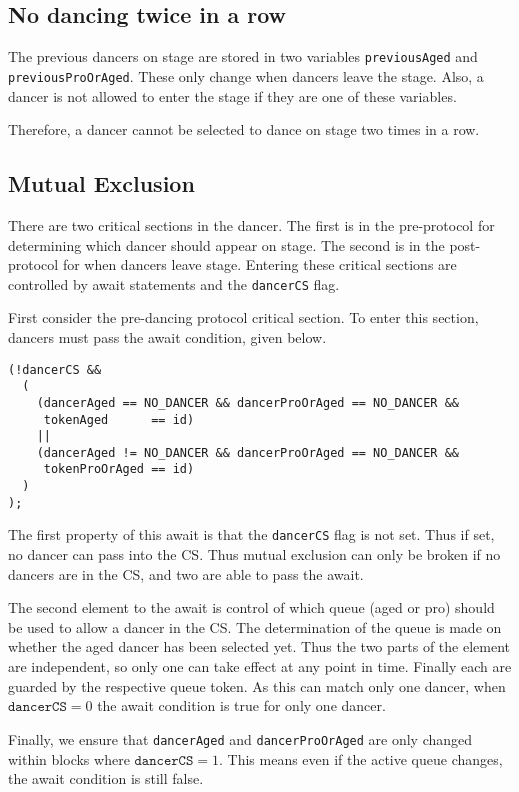 \documentclass[12pt,a4paper]{scrartcl}
\begin{document}
\subsection{No dancing twice in a row}
The previous dancers on stage are stored in two variables \texttt{previousAged} and \texttt{previousProOrAged}.
These only change when dancers leave the stage.
Also, a dancer is not allowed to enter the stage if they are one of these variables.

Therefore, a dancer cannot be selected to dance on stage two times in a row.

\subsection{Mutual Exclusion}
There are two critical sections in the dancer.
The first is in the pre-protocol for determining which dancer should appear on stage.
The second is in the post-protocol for when dancers leave stage.
Entering these critical sections are controlled by await statements and the \texttt{dancerCS} flag.

First consider the pre-dancing protocol critical section.
To enter this section, dancers must pass the await condition, given below.
\begin{lstlisting}
(!dancerCS &&
  (
    (dancerAged == NO_DANCER && dancerProOrAged == NO_DANCER &&
     tokenAged      == id)
    ||
    (dancerAged != NO_DANCER && dancerProOrAged == NO_DANCER &&
     tokenProOrAged == id)
  )
);
\end{lstlisting}
The first property of this await is that the \texttt{dancerCS} flag is not set.
Thus if set, no dancer can pass into the CS.
Thus mutual exclusion can only be broken if no dancers are in the CS, and two are able to pass the await.

The second element to the await is control of which queue (aged or pro) should be used to allow a dancer in the CS.
The determination of the queue is made on whether the aged dancer has been selected yet.
Thus the two parts of the element are independent, so only one can take effect at any point in time.
Finally each are guarded by the respective queue token.
As this can match only one dancer, when $\texttt{dancerCS} = 0$ the await condition is true for only one dancer.

Finally, we ensure that \texttt{dancerAged} and \texttt{dancerProOrAged} are only changed within blocks where $\texttt{dancerCS} = 1$.
This means even if the active queue changes, the await condition is still false.
\end{document}
